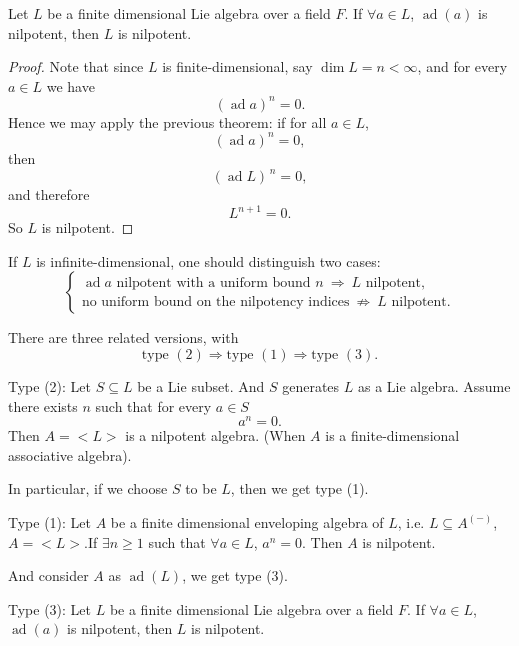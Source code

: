 \begin{theorem}
    Let $L$ be a finite dimensional Lie algebra over a field $F$. If $\forall a \in L$, $\operatorname{ad}(a) $ is nilpotent, then $L$ is nilpotent.
\end{theorem}

\begin{proof}
    Note that since $L$ is finite-dimensional, say $\dim L=n<\infty$, and for every $a\in L$ we have
    \[
        (\operatorname{ad} a)^n=0.
    \]
    Hence we may apply the previous theorem: if for all $a\in L$,
    \[
        (\operatorname{ad} a)^n=0,
    \]
    then
    \[
        (\operatorname{ad} L)^{\,n}=0,
    \]
    and therefore
    \[
        L^{n+1}=0.
    \]
    So $L$ is nilpotent.
\end{proof}

\begin{remark}
    If $L$ is infinite-dimensional, one should distinguish two cases:
    \[
        \left\{
        \begin{array}{l}
            \operatorname{ad} a \text{ nilpotent with a uniform bound } n
            \ \Longrightarrow\
            L \text{ nilpotent}, \\[4pt]
            \text{no uniform bound on the nilpotency indices}
            \ \nRightarrow\
            L \text{ nilpotent}.
        \end{array}
        \right.
    \]
\end{remark}

\begin{remark}
    There are three related versions, with
    \[
        \text{type }(2)\Longrightarrow \text{type }(1)\Longrightarrow \text{type }(3).
    \]

    Type (2): Let $S\subseteq L$ be a Lie subset. And $S$ generates $L$ as a Lie algebra. Assume there exists $n$ such that for every $a\in S$
    \[
        a^n =0.
    \]
    Then $A=<L>$ is a nilpotent algebra. (When $A$ is a finite-dimensional associative algebra).

    In particular, if we choose $S$ to be $L$, then we get type (1).

    Type (1): Let $ A $ be a finite dimensional enveloping algebra of $L$, i.e. $ L\subseteq A^{(-)} $, $ A = <L> $.If $ \exists n \ge 1 $ such that $ \forall a \in L $, $ a^n=0 $. Then $ A $ is nilpotent.

    And consider $A$ as $\operatorname{ad}(L)$, we get type (3).

    Type (3):    Let $L$ be a finite dimensional Lie algebra over a field $F$. If $\forall a \in L$, $\operatorname{ad}(a) $ is nilpotent, then $L$ is nilpotent.
\end{remark}

